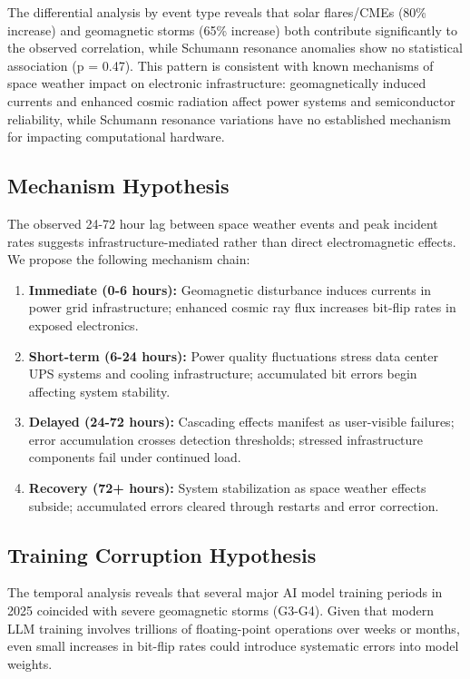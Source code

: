 \documentclass[11pt,a4paper]{article}
\begin{document}
The differential analysis by event type reveals that solar flares/CMEs (80\% increase) and geomagnetic storms (65\% increase) both contribute significantly to the observed correlation, while Schumann resonance anomalies show no statistical association (p = 0.47). This pattern is consistent with known mechanisms of space weather impact on electronic infrastructure: geomagnetically induced currents and enhanced cosmic radiation affect power systems and semiconductor reliability, while Schumann resonance variations have no established mechanism for impacting computational hardware.

\subsection{Mechanism Hypothesis}
The observed 24-72 hour lag between space weather events and peak incident rates suggests infrastructure-mediated rather than direct electromagnetic effects. We propose the following mechanism chain:

\begin{enumerate}
\item \textbf{Immediate (0-6 hours):} Geomagnetic disturbance induces currents in power grid infrastructure; enhanced cosmic ray flux increases bit-flip rates in exposed electronics.
\item \textbf{Short-term (6-24 hours):} Power quality fluctuations stress data center UPS systems and cooling infrastructure; accumulated bit errors begin affecting system stability.
\item \textbf{Delayed (24-72 hours):} Cascading effects manifest as user-visible failures; error accumulation crosses detection thresholds; stressed infrastructure components fail under continued load.
\item \textbf{Recovery (72+ hours):} System stabilization as space weather effects subside; accumulated errors cleared through restarts and error correction.
\end{enumerate}

\subsection{Training Corruption Hypothesis}
The temporal analysis reveals that several major AI model training periods in 2025 coincided with severe geomagnetic storms (G3-G4). Given that modern LLM training involves trillions of floating-point operations over weeks or months, even small increases in bit-flip rates could introduce systematic errors into model weights.
\end{document}

